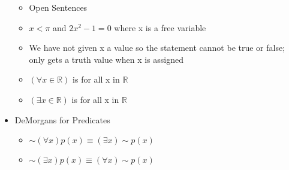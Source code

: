 \documentclass{article}
\begin{document}
\begin{itemize}
    \begin{itemize}
        \item Open Sentences
        \item $x < \pi$ and $2x^2 - 1 = 0 $ where x is a free variable
        \item We have not given x a value so the statement cannot be true or false; only gets a truth value when x is assigned
        \item $(\forall x \in \mathbb{R})$ is for all x in $\mathbb{R}$
        \item $(\exists x \in \mathbb{R})$ is for all x in $\mathbb{R}$
    \end{itemize}
    \item DeMorgans for Predicates
    \begin{itemize}
        \item $\sim (\forall x) p(x) \equiv (\exists x) \sim p(x)$
        \item $\sim (\exists x) p(x) \equiv (\forall x) \sim p(x)$
    \end{itemize}
\end{itemize}
\end{document}
